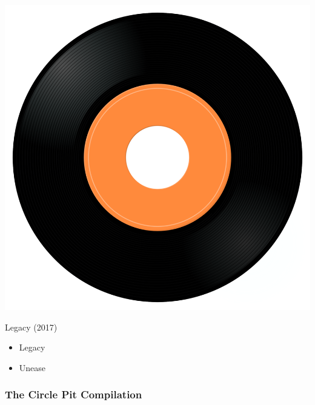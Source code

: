 \begin{minipage}[t]{0.25\textwidth}\vspace{0pt}
\captionsetup{type=figure}
\includegraphics[width=\textwidth]{Images/cover.png}
\caption*{Legacy (2017)}
\end{minipage}
\begin{minipage}[t]{0.25\textwidth}\vspace{0pt}
\begin{itemize}[nosep,leftmargin=1em,labelwidth=*,align=left]
	\setlength{\itemsep}{0pt}
	\item Legacy
	\item Unease
\end{itemize}
\end{minipage}


\subsubsection{The Circle Pit Compilation}

